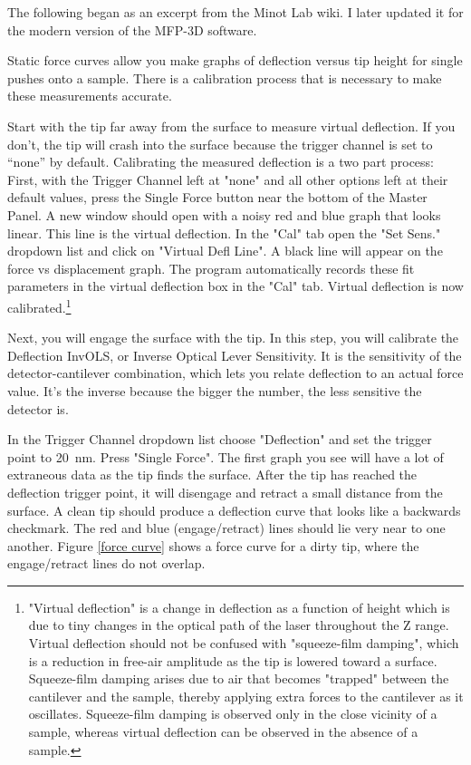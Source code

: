 \documentclass[double,12pt,1in,seploa]{beavtex}
\begin{document}
The following began as an excerpt from the Minot Lab wiki. I later updated it for the modern version of the MFP-3D software.

Static force curves allow you make graphs of deflection versus tip height for single pushes onto a sample. There is a calibration process that is necessary to make these measurements accurate.

Start with the tip far away from the surface to measure virtual deflection. If you don't, the tip will crash into the surface because the trigger channel is set to “none” by default. Calibrating the measured deflection is a two part process: First, with the Trigger Channel left at "none" and all other options left at their default values, press the Single Force button near the bottom of the Master Panel. A new window should open with a noisy red and blue graph that looks linear. This line is the virtual deflection. In the "Cal" tab open the "Set Sens." dropdown list and click on "Virtual Defl Line". A black line will appear on the force vs displacement graph. The program automatically records these fit parameters in the virtual deflection box in the "Cal" tab. Virtual deflection is now calibrated.\footnote{"Virtual deflection" is a change in deflection as a function of height which is due to tiny changes in the optical path of the laser throughout the Z range. Virtual deflection should not be confused with "squeeze-film damping", which is a reduction in free-air amplitude as the tip is lowered toward a surface. Squeeze-film damping arises due to air that becomes "trapped" between the cantilever and the sample, thereby applying extra forces to the cantilever as it oscillates. Squeeze-film damping is observed only in the close vicinity of a sample, whereas virtual deflection can be observed in the absence of a sample.}
        
Next, you will engage the surface with the tip. In this step, you will calibrate the Deflection InvOLS, or Inverse Optical Lever Sensitivity. It is the sensitivity of the detector-cantilever combination, which lets you relate deflection to an actual force value. It's the inverse because the bigger the number, the less sensitive the detector is. 

In the Trigger Channel dropdown list choose "Deflection" and set the trigger point to \SI{20}{\nano\meter}. Press "Single Force". The first graph you see will have a lot of extraneous data as the tip finds the surface. After the tip has reached the deflection trigger point, it will disengage and retract a small distance from the surface. A clean tip should produce a deflection curve that looks like a backwards checkmark. The red and blue (engage/retract) lines should lie very near to one another. Figure \ref{force curve} shows a force curve for a dirty tip, where the engage/retract lines do not overlap.
\end{document}
